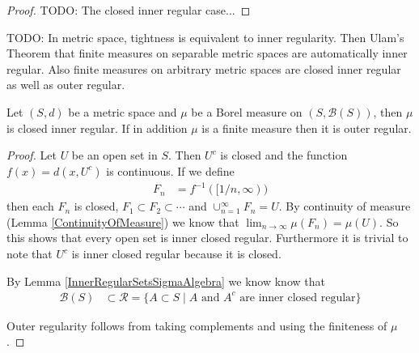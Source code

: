 \begin{proof}
TODO: The closed inner regular case...
\end{proof}

TODO:  In metric space, tightness is equivalent to inner regularity.
Then Ulam's Theorem that finite measures on separable metric spaces
are automatically inner regular.  Also finite measures on arbitrary
metric spaces are closed inner regular as well as outer regular.

\begin{lem}\label{FiniteMeasuresOnMetricSpacesAreClosedInnerRegular}
Let $(S,d)$ be a metric space and $\mu$ be a Borel measure on $(S,
\mathcal{B}(S))$, then $\mu$ is closed inner regular.  If in addition
$\mu$ is a finite measure then it is outer regular.
\end{lem}
\begin{proof}
Let $U$ be an open set in $S$.  Then $U^c$ is closed and the
function $f(x) = d(x, U^c)$ is continuous.  If we define 
\begin{align*}
F_n &= f^{-1}([1/n, \infty))
\end{align*}
then each $F_n$ is closed, $F_1 \subset F_2 \subset \cdots$ and
$\cup_{n=1}^\infty F_n = U$.  By continuity of measure (Lemma
\ref{ContinuityOfMeasure}) we know that $\lim_{n \to \infty} \mu(F_n)
= \mu(U)$.  So this shows that every open set is inner closed
regular.  Furthermore it is trivial to note that $U^c$ is inner closed
regular because it is closed.  

By Lemma \ref{InnerRegularSetsSigmaAlgebra} we know know that 
\begin{align*}
\mathcal{B}(S) &\subset \mathcal{R} = \lbrace A \subset S \mid A
\text{ and } A^c
\text{ are inner closed regular}  \rbrace
\end{align*}

Outer regularity follows from taking complements and using the
finiteness of $\mu$.
\end{proof}

